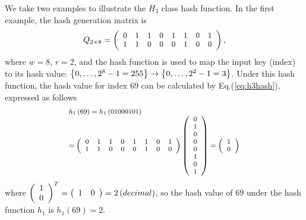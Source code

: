 \documentclass[10pt,journal,compsoc]{IEEEtran}
\begin{document}
We take two examples to illustrate the $H_3$ class hash function. In the first example, the hash generation matrix is
\begin{equation}
\footnotesize
{Q_{2 \times 8}} = \left( {\begin{array}{*{20}{c}}
   0 & 1 & 1 & 0 & 1 & 1 & 0 & 1  \\
   1 & 1 & 0 & 0 & 0 & 1 & 0 & 0  \\
\end{array}} \right),
\label{eq:h1matrix}
\end{equation}
where $w=8$, $r=2$, and the hash function is used to map the input key (index) to its hash value: $\left\{ {0, \ldots ,{{\rm{2}}^{\rm{8}}} - {\rm{1}} = {\rm{255}}} \right\} \to \left\{ {0, \ldots ,{{\rm{2}}^{\rm{2}}} - {\rm{1}} = {\rm{3}}} \right\}$. Under this hash function, the hash value for index 69 can be calculated by Eq.(\ref{eq:h3hash}), expressed as follows
\begin{equation}
\scriptsize
\begin{array}{l}
 h_1\left( {69} \right) = h_1\left( {{\rm{01000101}}} \right) \\
  = \left( {\begin{array}{*{20}{c}}
   0 & 1 & 1 & 0 & 1 & 1 & 0 & 1  \\
   1 & 1 & 0 & 0 & 0 & 1 & 0 & 0  \\
\end{array}} \right)\left( {\begin{array}{*{20}{c}}
   0  \\
   1  \\
   0  \\
   0  \\
   0  \\
   1  \\
   0  \\
   1  \\
\end{array}} \right) = \left( {\begin{array}{*{20}{c}}
   1  \\
   0  \\
\end{array}} \right) \\
 \end{array}
\label{eq:h3example1}
\end{equation}
where $\small {\left( {\begin{array}{*{20}{c}}
   1  \\
   0  \\
\end{array}} \right)^T} = \left( {\begin{array}{*{20}{c}}
   1 & 0  \\
\end{array}} \right) = 2\left( {decimal} \right)$, so the hash value of 69 under the hash function $h_1$ is $h_1(69)=2$.
\end{document}
